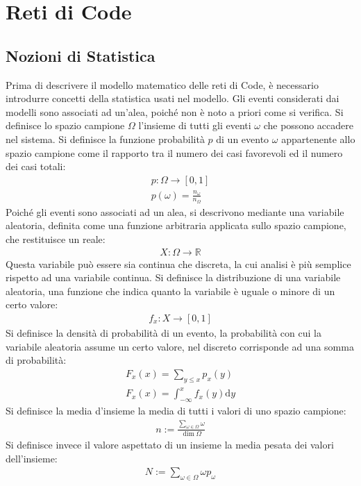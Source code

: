 \documentclass{article}
\newcommand{\df}{\mathrm{d}}
\numberwithin{equation}{subsection}
\begin{document}
\clearpage

\section{Reti di Code}

\subsection{Nozioni di Statistica}

Prima di descrivere il modello matematico delle reti di Code, è necessario introdurre concetti della statistica usati nel modello. Gli eventi considerati dai modelli sono 
associati ad un'alea, poiché non è noto a priori come si verifica. Si definisce lo spazio campione $\Omega$ l'insieme di tutti gli eventi $\omega$ che possono accadere nel 
sistema. Si definisce la funzione probabilità $p$ di un evento $\omega$ appartenente allo spazio campione come il rapporto tra il numero dei casi favorevoli ed il numero dei casi 
totali:
\begin{gather*}
    p:\Omega\to[0,1]\\
    p(\omega)=\displaystyle\frac{n_{\omega}}{n_{\Omega}}
\end{gather*}
Poiché gli eventi sono associati ad un alea, si descrivono mediante una variabile aleatoria, definita come una funzione arbitraria applicata sullo spazio campione, che 
restituisce un reale:
\begin{gather*}
    X:\Omega\to\mathbb{R}
\end{gather*}
Questa variabile può essere sia continua che discreta, la cui analisi è più semplice rispetto ad una variabile continua. 
Si definisce la distribuzione di una variabile aleatoria, una funzione che indica quanto la variabile è uguale o minore di un certo valore:
\begin{gather*}
    f_x:X\to[0,1]
\end{gather*}
Si definisce la densità di probabilità di un evento, la probabilità con cui la variabile aleatoria assume un certo valore, nel discreto corrisponde ad una somma di probabilità:
\begin{gather*}
    F_x(x)=\displaystyle\sum_{y\leq x}p_x(y)\\
    F_x(x)=\displaystyle\int_{-\infty}^xf_x(y)\df y
\end{gather*}
Si definisce la media d'insieme la media di tutti i valori di uno spazio campione:
\begin{gather*}
    n:=\displaystyle\frac{\displaystyle\sum_{\omega\in\Omega}\omega}{\dim\Omega}
\end{gather*}
Si definisce invece il valore aspettato di un insieme la media pesata dei valori dell'insieme:
\begin{gather*}
    N:=\displaystyle\sum_{\omega\in\Omega}\omega p_\omega
\end{gather*}
\end{document}
